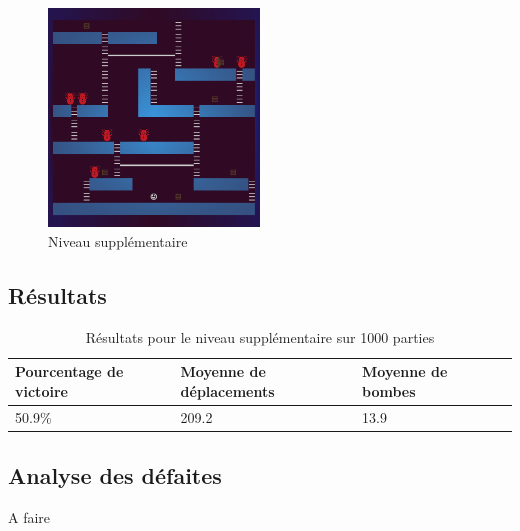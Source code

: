 \begin{figure}[!htpb]
    \centering
    \includegraphics[width=0.5\textwidth]{Figures/level4.png}
    \caption{Niveau supplémentaire}
    \label{fig:niveau-supplementaire}
\end{figure}

\newpage

\subsection{Résultats}

\begin{table}[!htpb]
    \begin{tabularx}{\textwidth}{lXXX}
        \toprule
        Pourcentage de victoire & Moyenne de déplacements & Moyenne de bombes \\
        \midrule
        50.9\% & 209.2 & 13.9 \\
        \bottomrule
    \end{tabularx}
    \caption{Résultats pour le niveau supplémentaire sur 1000 parties}
    \label{tab:res-niveau-supplementaire}
\end{table}

\subsection{Analyse des défaites}

A faire